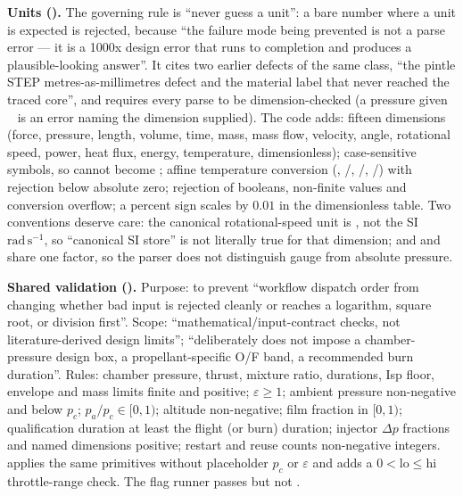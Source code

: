 \textbf{Units ().} The governing rule is ``never guess a unit'': a bare number where a unit is expected is rejected, because ``the failure mode being prevented is not a parse error --- it is a 1000x design error that runs to completion and produces a plausible-looking answer''. It cites two earlier defects of the same class, ``the pintle STEP metres-as-millimetres defect and the material label that never reached the traced core'', and requires every parse to be dimension-checked (a pressure given ~ is an error naming the dimension supplied). The code adds: fifteen dimensions (force, pressure, length, volume, time, mass, mass flow, velocity, angle, rotational speed, power, heat flux, energy, temperature, dimensionless); case-sensitive symbols, so  cannot become ; affine temperature conversion (, /, /, /) with rejection below absolute zero; rejection of booleans, non-finite values and conversion overflow; a percent sign scales by $0.01$ in the dimensionless table. Two conventions deserve care: the canonical rotational-speed unit is , not the SI $\mathrm{rad\,s^{-1}}$, so ``canonical SI store'' is not literally true for that dimension; and  and  share one factor, so the parser does not distinguish gauge from absolute pressure.

\textbf{Shared validation ().} Purpose: to prevent ``workflow dispatch order from changing whether bad input is rejected cleanly or reaches a logarithm, square root, or division first''. Scope: ``mathematical/input-contract checks, not literature-derived design limits'';  ``deliberately does not impose a chamber-pressure design box, a propellant-specific O/F band, a recommended burn duration''. Rules: chamber pressure, thrust, mixture ratio, durations, Isp floor, envelope and mass limits finite and positive; $\varepsilon \geq 1$; ambient pressure non-negative and below $p_c$; $p_a/p_c \in [0, 1)$; altitude non-negative; film fraction in $[0, 1)$; qualification duration at least the flight (or burn) duration; injector $\Delta p$ fractions and named dimensions positive; restart and reuse counts non-negative integers.  applies the same primitives without placeholder $p_c$ or $\varepsilon$ and adds a $0 < \mathrm{lo} \leq \mathrm{hi}$ throttle-range check. The flag runner passes  but not .

